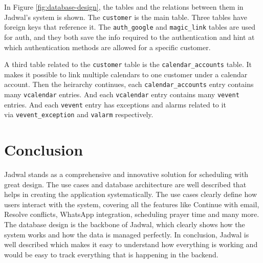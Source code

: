 \documentclass[12pt,a4paper]{report}
\begin{document}
\newpage

In Figure \ref{fig:database-design}, the tables and the relations between them in Jadwal's system is shown. The \texttt{customer} is the main table. Three tables have foreign keys that reference it. The \texttt{auth\_google} and \texttt{magic\_link} tables are used for auth, and they both save the info required to the authentication and hint at which authentication methods are allowed for a specific customer.

A third table related to the \texttt{customer} table is the \texttt{calendar\_accounts} table. It makes it possible to link multiple calendars to one customer under a calendar account. Then the heirarchy continues, each \texttt{calendar\_accounts} entry contains many \texttt{vcalendar} entries. And each \texttt{vcalendar} entry contains many \texttt{vevent} entries. And each \texttt{vevent} entry has exceptions and alarms related to it\\via \texttt{vevent\_exception} and \texttt{valarm} respectively.

\section{Conclusion}

Jadwal stands as a comprehensive and innovative solution for scheduling with great design. The use cases and database architecture are well described that helps in creating the application systematically. The use cases clearly define how users interact with the system, covering all the features like Continue with email, Resolve conflicts, WhatsApp integration, scheduling prayer time and many more. The database design is the backbone of Jadwal, which clearly shows how the system works and how the data is managed perfectly. In conclusion, Jadwal is well described which makes it easy to understand how everything is working and would be easy to track everything that is happening in the backend. 



\end{document}
